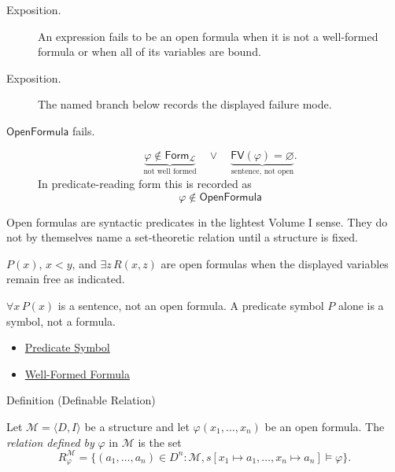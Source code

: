 \begin{remark*}
\begin{description}
  \item[Exposition.] An expression fails to be an open formula when it is not a well-formed formula
or when all of its variables are bound.
\end{description}
\end{remark*}

\begin{remark*}
\begin{description}
  \item[Exposition.] The named branch below records the displayed failure mode.
\item[\(\mathsf{OpenFormula}\) fails.] \[
\underbrace{\varphi\notin\mathsf{Form}_{\mathcal L}}_{\text{not well formed}}
\quad\lor\quad
\underbrace{\mathsf{FV}(\varphi)=\varnothing}_{\text{sentence, not open}}.
\]
  In predicate-reading form this is recorded as
  \[
    \varphi\notin\mathsf{OpenFormula}
  \]
\end{description}
\end{remark*}

\begin{remark*}[Interpretation]
Open formulas are syntactic predicates in the lightest Volume I sense. They do
not by themselves name a set-theoretic relation until a structure is fixed.
\end{remark*}

\begin{remark*}[Examples]
\(P(x)\), \(x<y\), and \(\exists z\,R(x,z)\) are open formulas when the
displayed variables remain free as indicated.
\end{remark*}

\begin{remark*}
\(\forall x\,P(x)\) is a sentence, not an open formula. A predicate symbol
\(P\) alone is a symbol, not a formula.
\end{remark*}

\begin{dependencies}
\begin{itemize}
  \item \hyperref[def:predicate-symbol]{Predicate Symbol}
  \item \hyperref[def:wff-pred]{Well-Formed Formula}
\end{itemize}
\end{dependencies}

\begin{definitionbox}{Definition (Definable Relation)}
\begin{definition}
\label{def:definable-relation}
Let \(\mathcal M=\langle D,I\rangle\) be a structure and let
\(\varphi(x_1,\ldots,x_n)\) be an open formula. The \emph{relation defined by}
\(\varphi\) in \(\mathcal M\) is the set
\[
R_{\varphi}^{\mathcal M}
=
\{(a_1,\ldots,a_n)\in D^n:
\mathcal M,s[x_1\mapsto a_1,\ldots,x_n\mapsto a_n]\models\varphi\}.
\]
\end{definition}
\end{definitionbox}

